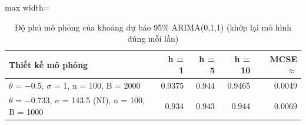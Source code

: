 \begin{table}[H]
\centering\footnotesize
\caption{Độ phủ mô phỏng của khoảng dự báo 95\% ARIMA(0,1,1) (khớp lại mô hình đúng mỗi lần)}\label{tab:tab_b12_08_coverage}
\begin{adjustbox}{max width=\linewidth}
\begin{tabular}{|>{\raggedright\arraybackslash}p{}|r|r|r|r|}
\toprule
Thiết kế mô phỏng & h = 1 & h = 5 & h = 10 & MCSE $\approx$ \\
\midrule
$\theta$ = $-$0.5, $\sigma$ = 1, n = 100, B = 2000 & 0.9375 & 0.944 & 0.9465 & 0.0049 \\[3pt]
$\theta$ = $-$0.733, $\sigma$ = 143.5 (NI), n = 100, B = 1000 & 0.934 & 0.943 & 0.944 & 0.0069 \\[3pt]
\bottomrule
\end{tabular}
\end{adjustbox}
\end{table}
